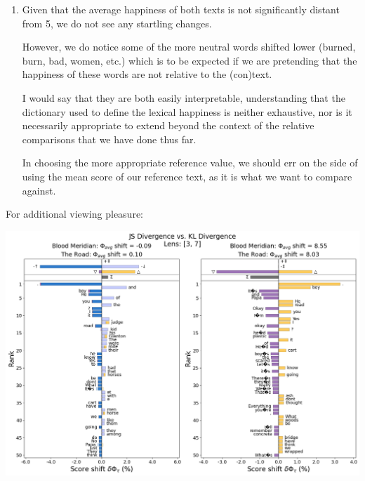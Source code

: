 \begin{enumerate}
\begin{enumerate}[wide, labelwidth=!, labelindent=0pt]
  \item

    Given that the average happiness of both texts is not significantly distant from 5, we do not see any startling changes.

    However, we do notice some of the more neutral words shifted lower (burned, burn, bad, women, etc.) which is to be expected if we are pretending that the happiness of these  words are not relative to the (con)text.

    I would say that they are both easily interpretable, understanding that the dictionary used to define the lexical happiness is neither exhaustive, nor is it necessarily appropriate to extend beyond the context of the relative comparisons that we have done thus far.

    In choosing the more appropriate reference value, we should err on the side of using the mean score of our reference text, as it is what we want to compare against.
    
  \end{enumerate}

   \solutionend

For additional viewing pleasure:

\begin{center}
    \includegraphics[width=\linewidth]{figures/jsd_kld.png}
\end{center}

\end{enumerate}

